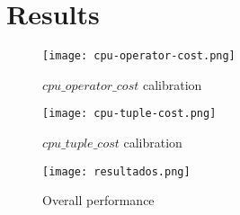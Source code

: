 \chapter{Results}

\label{chap:results}

 
 \begin{figure}[ht]
 \centering
 \texttt{[image: cpu-operator-cost.png]}
 \caption{$cpu\_operator\_cost$ calibration}
 \label{fig:cpuop}
 \end{figure} 
% 
% 
 \begin{figure}[ht]
 \centering
 \texttt{[image: cpu-tuple-cost.png]}
 \caption{$cpu\_tuple\_cost$ calibration}
 \label{fig:cputp}
 \end{figure} 
% 
% 
 \begin{figure}[ht]
 \centering
 \texttt{[image: resultados.png]}
 \caption{Overall performance}
 \label{fig:perform}
 \end{figure} 